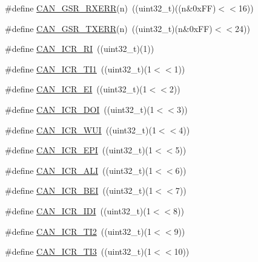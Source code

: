\begin{DoxyCompactItemize}
\item 
\#define \hyperlink{group___c_a_n___private___macros_ga6c1dfb3c4e775f46effbff095b230673}{\-C\-A\-N\-\_\-\-G\-S\-R\-\_\-\-R\-X\-E\-R\-R}(n)~((uint32\-\_\-t)((n\&0x\-F\-F)$<$$<$16))
\item 
\#define \hyperlink{group___c_a_n___private___macros_gaf6a01e0337eac8147f58b709c09ad347}{\-C\-A\-N\-\_\-\-G\-S\-R\-\_\-\-T\-X\-E\-R\-R}(n)~((uint32\-\_\-t)(n\&0x\-F\-F)$<$$<$24))
\item 
\#define \hyperlink{group___c_a_n___private___macros_ga7d64f1d188b6121983be38f7d688c6d0}{\-C\-A\-N\-\_\-\-I\-C\-R\-\_\-\-R\-I}~((uint32\-\_\-t)(1))
\item 
\#define \hyperlink{group___c_a_n___private___macros_ga4a568e35c08d16197f943bcdaf48b4de}{\-C\-A\-N\-\_\-\-I\-C\-R\-\_\-\-T\-I1}~((uint32\-\_\-t)(1$<$$<$1))
\item 
\#define \hyperlink{group___c_a_n___private___macros_gab04d96ef59661fd0d47ff05ddc3397d9}{\-C\-A\-N\-\_\-\-I\-C\-R\-\_\-\-E\-I}~((uint32\-\_\-t)(1$<$$<$2))
\item 
\#define \hyperlink{group___c_a_n___private___macros_ga9fae105cbd02053ab9bd369c473b859c}{\-C\-A\-N\-\_\-\-I\-C\-R\-\_\-\-D\-O\-I}~((uint32\-\_\-t)(1$<$$<$3))
\item 
\#define \hyperlink{group___c_a_n___private___macros_gaf0e24df45c2cc58b8b05c8475c0dbc0f}{\-C\-A\-N\-\_\-\-I\-C\-R\-\_\-\-W\-U\-I}~((uint32\-\_\-t)(1$<$$<$4))
\item 
\#define \hyperlink{group___c_a_n___private___macros_ga81258499c237327be7203edaa80adcd0}{\-C\-A\-N\-\_\-\-I\-C\-R\-\_\-\-E\-P\-I}~((uint32\-\_\-t)(1$<$$<$5))
\item 
\#define \hyperlink{group___c_a_n___private___macros_ga1807f526e7aed02db75fd75435cd3d44}{\-C\-A\-N\-\_\-\-I\-C\-R\-\_\-\-A\-L\-I}~((uint32\-\_\-t)(1$<$$<$6))
\item 
\#define \hyperlink{group___c_a_n___private___macros_ga667b60ec168d7c17a932e562f45f6a76}{\-C\-A\-N\-\_\-\-I\-C\-R\-\_\-\-B\-E\-I}~((uint32\-\_\-t)(1$<$$<$7))
\item 
\#define \hyperlink{group___c_a_n___private___macros_gab57b8c6d33827a856266f8340052ce84}{\-C\-A\-N\-\_\-\-I\-C\-R\-\_\-\-I\-D\-I}~((uint32\-\_\-t)(1$<$$<$8))
\item 
\#define \hyperlink{group___c_a_n___private___macros_gad43c387e2fbc22cc95c3b3803e5e890f}{\-C\-A\-N\-\_\-\-I\-C\-R\-\_\-\-T\-I2}~((uint32\-\_\-t)(1$<$$<$9))
\item 
\#define \hyperlink{group___c_a_n___private___macros_ga82d809099125ff45ae2f404eea9113a0}{\-C\-A\-N\-\_\-\-I\-C\-R\-\_\-\-T\-I3}~((uint32\-\_\-t)(1$<$$<$10))

\end{DoxyCompactItemize}
